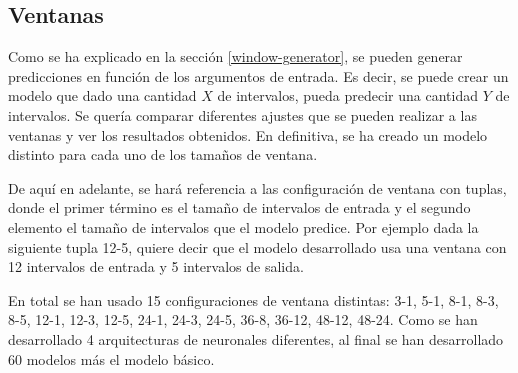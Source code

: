\subsection{Ventanas}

Como se ha explicado en la sección \ref{window-generator}, se pueden generar predicciones en función de los argumentos de entrada. Es decir, se puede crear un modelo que dado una cantidad $X$ de intervalos, pueda predecir una cantidad $Y$ de intervalos. Se quería comparar diferentes ajustes que se pueden realizar a las ventanas y ver los resultados obtenidos. En definitiva, se ha creado un modelo distinto para cada uno de los tamaños de ventana.
\newline

De aquí en adelante, se hará referencia a las configuración de ventana con tuplas, donde el primer término es el tamaño de intervalos de entrada y el segundo elemento el tamaño de intervalos que el modelo predice. Por ejemplo dada la siguiente tupla 12-5, quiere decir que el modelo desarrollado usa una ventana con 12 intervalos de entrada y 5 intervalos de salida.
\newline

En total se han usado 15 configuraciones de ventana distintas: 3-1, 5-1, 8-1, 8-3, 8-5, 12-1, 12-3, 12-5, 24-1, 24-3, 24-5, 36-8, 36-12, 48-12, 48-24. Como se han desarrollado 4 arquitecturas de neuronales diferentes, al final se han desarrollado 60 modelos más el modelo básico. 
